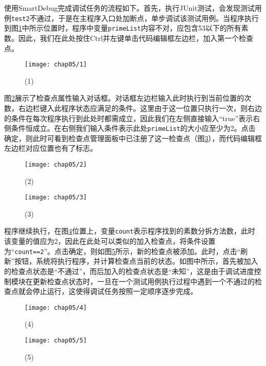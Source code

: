 使用SmartDebug完成调试任务的流程如下。首先，执行JUnit测试，会发现测试用例\texttt{test2}不通过，于是在主程序入口处加断点，单步调试该测试用例。当程序执行到图\ref{fig:example-1}中所示位置时，程序中变量\texttt{primeList}内容不对，应包含53以下的所有素数。因此，我们在此处按住Ctrl并左键单击代码编辑框左边栏，加入第一个检查点。

\begin{figure}
	\centering
	\texttt{[image: chap05/1]}
	\caption{(1)}
	\label{fig:example-1}
\end{figure}

图\ref{fig:example-2}展示了检查点属性输入对话框。对话框左边栏输入此时执行到当前位置的次数，右边栏键入此程序状态应满足的条件。这里由于这一位置只执行一次，则右边的条件在每次程序执行到此处时都需成立，因此我们在左侧直接输入“true”表示右侧条件恒成立。在右侧我们输入条件表示此处\texttt{primeList}的大小应至少为2。点击确定，则此时可看到检查点管理面板中已注册了这一检查点（图\ref{fig:example-3}），而代码编辑框左边栏对应位置也有了标志。

\begin{figure}
	\centering
	\texttt{[image: chap05/2]}
	\caption{(2)}
	\label{fig:example-2}
\end{figure}
\begin{figure}
	\centering
	\texttt{[image: chap05/3]}
	\caption{(3)}
	\label{fig:example-3}
\end{figure}

程序继续执行，在图\ref{fig:example-4}位置上，变量\texttt{count}表示程序找到的素数分拆方法数，此时该变量的值应为2，因此在此处可以类似的加入检查点，将条件设置为“\texttt{count==2}”。点击确定，则如图\ref{fig:example-5}所示，新的检查点被添加。此时，点击“刷新”按钮，系统将执行程序，并计算检查点当前的状态。如图中所示，首先被加入的检查点状态是“不通过”，而后加入的检查点状态是“未知”，这是由于调试进度控制模块在更新检查点状态时，一旦在一个测试用例执行过程中遇到一个不通过的检查点就会停止运行，这使得调试任务按照一定顺序逐步完成。
\begin{figure}
	\centering
	\texttt{[image: chap05/4]}
	\caption{(4)}
	\label{fig:example-4}
\end{figure}
\begin{figure}
	\centering
	\texttt{[image: chap05/5]}
	\caption{(5)}
	\label{fig:example-5}
\end{figure}

